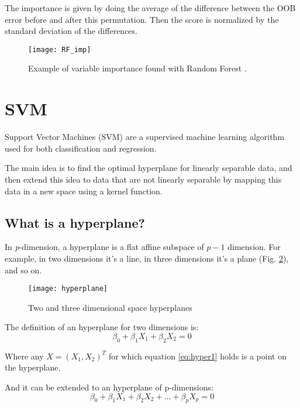 The importance is given by doing the average of the difference between the OOB error before and after this permutation. Then the score is normalized by the standard deviation of the differences.

\begin{figure}[H]
	\centering
	\texttt{[image: RF\_imp]}
	\caption{Example of variable importance found with Random Forest \cite{rf_imp}.}
	\label{fig:RF_imp}
\end{figure}

\pagebreak

\section{SVM} \label{svm}
Support Vector Machines (SVM) are a supervised machine learning algorithm used for both classification and regression.

The main idea is to find the optimal hyperplane for linearly separable data, and then extend this idea to data that are not linearly separable by mapping this data in a new space using a kernel function.

\subsection{What is a hyperplane?}
In \textit{p}-dimension, a hyperplane is a flat affine subspace of $p - 1$ dimension. For example, in two dimensions it's a line, in three dimensions it's a plane (Fig. \ref{fig:hyperplane}), and so on.

\begin{figure}[H]
	\centering
	\texttt{[image: hyperplane]}
	\caption{Two and three dimensional space hyperplanes \cite{hyperplaneimg}}
	\label{fig:hyperplane}
\end{figure}

The definition of an hyperplane for two dimensions is:
\begin{equation} \label{eq:hyper1}
\beta_0 + \beta_1 X_1 + \beta_2 X_2 = 0
\end{equation}

Where any $X = (X_1, X_2)^T$ for which equation \ref{eq:hyper1} holds is a point on the hyperplane.

And it can be extended to an hyperplane of p-dimensions:
\begin{equation} \label{eq:hyper2}
\beta_0 + \beta_1 X_1 + \beta_2 X_2 + \dots + \beta_p X_p = 0
\end{equation}

